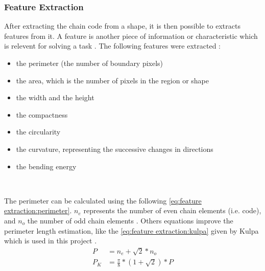 \subsubsection{Feature Extraction}


After extracting the chain code from a shape, it is then possible to extracts features from it. A feature is another piece of information or characteristic which is relevent for solving a task \cite{bib:extraction:definition}. The following features were extracted : 
\begin{itemize}
	\item the perimeter (the number of boundary pixels)
	\item the area, which is the number of pixels in the region or shape 
	\item the width and the height 
	\item the compactness 
	\item the circularity 
	\item the curvature, representing the successive changes in directions 
	\item the bending energy 
\end{itemize}

~~ 

The perimeter can be calculated using the following \vref{eq:feature extraction:perimeter}. $n_e$ represents the number of even chain elements (i.e. code), and $n_o$ the number of odd chain elements \cite{bib:chain:EstimateAreasAndPerimetersChainCode}. Others equations improve the perimeter length estimation, like the \vref{eq:feature extraction:kulpa} given by Kulpa which is used in this project \cite{bib:chain:ObjectDescription}.
\begin{align} 
P &= n_e + \sqrt{2}*n_o \label{eq:feature extraction:perimeter} \\
P_K &= \frac{\pi}{8} * (1 + \sqrt{2}) * P \label{eq:feature extraction:kulpa}
\end{align}


~~

